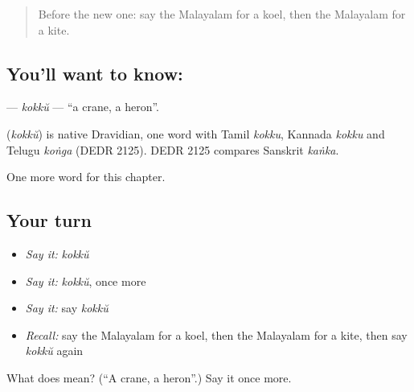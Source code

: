 \begin{quote}
Before the new one: say the Malayalam for a koel, then the Malayalam for a kite.
\end{quote}

\subsection*{You'll want to know: }
\textbf{} — \emph{kokkŭ} — \textquotedblleft{}a crane, a heron\textquotedblright{}.

\begin{cousinweb}
\textbf{} (\emph{kokkŭ}) is native Dravidian, one word with Tamil \emph{kokku}, Kannada \emph{kokku} and Telugu \emph{koṅga} (DEDR 2125). DEDR 2125 compares Sanskrit \emph{kaṅka}.
\end{cousinweb}

\begin{grammarlens}[title={What you've built}]
One more word for this chapter.
\end{grammarlens}

\subsection*{Your turn}
\begin{itemize}
\raggedright
  \item \emph{Say it:} \emph{kokkŭ}
  \item \emph{Say it:} \emph{kokkŭ}, once more
  \item \emph{Say it:} say \emph{kokkŭ}
  \item \emph{Recall:} say the Malayalam for a koel, then the Malayalam for a kite, then say \emph{kokkŭ} again
\end{itemize}

\begin{tcolorbox}[breakable,colback=teal!4,colframe=teal!35!black,title={Before you move on}]
What does  mean? (\textquotedblleft{}A crane, a heron\textquotedblright{}.) Say it once more.
\end{tcolorbox}
